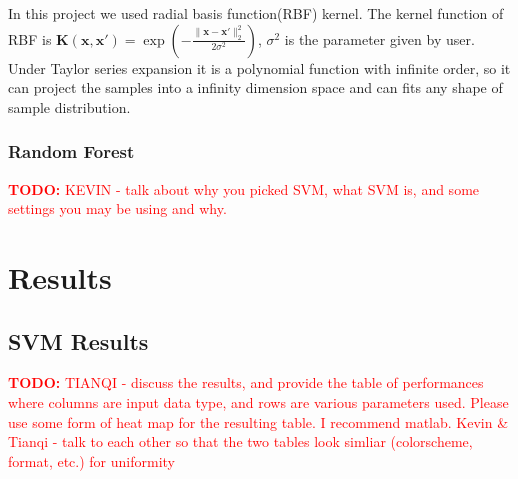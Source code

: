 \documentclass[paper=a4, fontsize=11pt]{scrartcl}
\numberwithin{equation}{section}    %
\numberwithin{figure}{section}      %
\numberwithin{table}{section}       %
\newcommand{\TODO}[1]{\textcolor{red}{\textbf{TODO: } #1}}
\numberwithin{equation}{section}    %
\numberwithin{figure}{section}      %
\numberwithin{table}{section}       %
\begin{document}
In this project we used radial basis function(RBF) kernel. The kernel function of RBF is $\boldsymbol{K}(\boldsymbol{x},\boldsymbol{x'})=\exp(-\frac{\|\boldsymbol{x}-\boldsymbol{x'}\|_2^2}{2\sigma^2})$, $\sigma^2$ is the parameter given by user. Under Taylor series expansion it is a polynomial function with infinite order, so it can project the samples into a infinity dimension space and can fits any shape of sample distribution.



\subsubsection{Random Forest}

\TODO{KEVIN - talk about why you picked SVM, what SVM is, and some settings you may be using and why.}


\section{Results}

\subsection{SVM Results}

\TODO{TIANQI - discuss the results, and provide the table of performances where columns are input data type, and rows are various parameters used. Please use some form of heat map for the resulting table. I recommend matlab. Kevin \& Tianqi - talk to each other so that the two tables look simliar (colorscheme, format, etc.) for uniformity}
\end{document}
